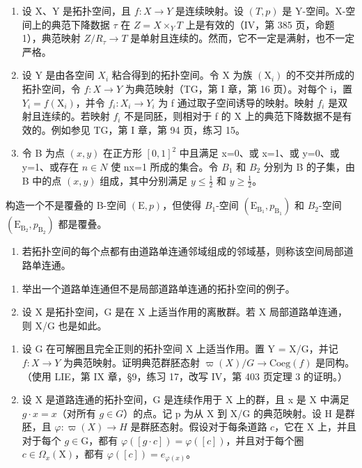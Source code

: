 \exercisegroup

\begin{enumerate}
\def\labelenumi{\arabic{enumi})}
\item
  设 X、Y 是拓扑空间，且 \(f: X \to Y\) 是连续映射。设 \((T, p)\) 是 Y-空间。X-空间上的典范下降数据 \(\tau\) 在 \(Z = X \times_{Y} T\) 上是有效的（IV，第 385 页，命题 1），典范映射 \(Z/R_{\tau} \to T\) 是单射且连续的。然而，它不一定是满射，也不一定严格。
\item
  设 Y 是由各空间 \(X_{i}\) 粘合得到的拓扑空间。令 X 为族 \((\mathrm{X}_{i})\) 的不交并所成的拓扑空间，令 \(f: X \to Y\) 为典范映射（TG，第 I 章，第 16 页）。对每个 i，置 \(Y_{i} = f(\mathrm{X}_{i})\)，并令 \(f_{i}: X_{i} \to Y_{i}\) 为 f 通过取子空间诱导的映射。映射 \(f_{i}\) 是双射且连续的。若映射 \(f_{i}\) 不是同胚，则相对于 f 的 X 上的典范下降数据不是有效的。例如参见 TG，第 I 章，第 94 页，练习 15。
\item
  令 B 为点 \((x,y)\) 在正方形 \([0,1]^{2}\) 中且满足 x=0、或 x=1、或 y=0、或 y=1、或存在 \(n\in N\) 使 nx=1 所成的集合。令 \(B_{1}\) 和 \(B_{2}\) 分别为 B 的子集，由 B 中的点 \((x,y)\) 组成，其中分别满足 \(y\leqslant\frac{1}{2}\) 和 \(y\geqslant\frac{1}{2}\)。
\end{enumerate}

构造一个不是覆叠的 B-空间 \((\mathrm{E}, p)\)，但使得 \(B_{1}\)-空间 \((\mathrm{E}_{\mathrm{B}_{1}}, p_{\mathrm{B}_{1}})\) 和 \(B_{2}\)-空间 \((\mathrm{E}_{\mathrm{B}_{2}}, p_{\mathrm{B}_{2}})\) 都是覆叠。

\begin{enumerate}
\def\labelenumi{\arabic{enumi})}
\setcounter{enumi}{3}
\tightlist
\item
  若拓扑空间的每个点都有由道路单连通邻域组成的邻域基，则称该空间局部道路单连通。
\end{enumerate}

\begin{enumerate}
\def\labelenumi{\alph{enumi})}
\item
  举出一个道路单连通但不是局部道路单连通的拓扑空间的例子。
\item
  设 X 是拓扑空间，G 是在 X 上适当作用的离散群。若 X 局部道路单连通，则 X/G 也是如此。
\end{enumerate}

\begin{enumerate}
\def\labelenumi{\arabic{enumi})}
\setcounter{enumi}{4}
\item
  设 G 在可解圈且完全正则的拓扑空间 X 上适当作用。置 Y = X/G，并记 \(f: X \to Y\) 为典范映射。证明典范群胚态射 \(\varpi(X)/G \to \text{Coeg}(f)\) 是同构。（使用 LIE，第 IX 章，§9，练习 17，改写 IV，第 403 页定理 3 的证明。）
\item
 设 X 是道路连通的拓扑空间，G 是连续作用于 X 上的群，且 x 是 X 中满足 \(g \cdot x = x\)（对所有 \(g \in G\)）的点。记 p 为从 X 到 X/G 的典范映射。设 H 是群胚，且 \(\varphi: \varpi(X) \to H\) 是群胚态射。假设对于每条道路 \(c\)，它在 \(\mathrm{X}\) 上，并且对于每个 \(g\in \mathrm{G}\)，都有 \(\varphi ([g\cdot c]) = \varphi ([c])\)，并且对于每个圈 \(c\in \Omega_x(\mathrm{X})\)，都有 \(\varphi ([c]) = e_{\varphi (x)}\)。
\end{enumerate}

